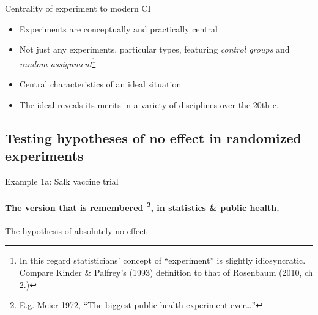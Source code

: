 \begin{frame}{Centrality of experiment to modern CI}
  \begin{itemize}
  \item Experiments are conceptually and practically central
  \item Not just any experiments, particular types, featuring
    \textit{control groups} and \textit{random assignment}\footnote{In
    this regard statisticians' concept of ``experiment'' is slightly
    idiosyncratic.  Compare Kinder \& Palfrey's (1993) definition to that of
    Rosenbaum (2010, ch 2.)}
  \item Central characteristics of an ideal situation
  \item The ideal reveals its merits in a variety of disciplines over
    the 20th c.
  \end{itemize}
\end{frame}

\subsection{Testing hypotheses of no effect in randomized experiments}
\begin{frame}{Example 1a: Salk vaccine trial}
\framesubtitle{
   The version that is remembered \footnote{E.g.
      \href{http://www.cengage.com/resource_uploads/downloads/0534094929_46500.pdf}{Meier
        1972}, ``The biggest public health experiment ever\ldots''}, in statistics \& public health. }



\end{frame}

\begin{frame}{The hypothesis of absolutely no effect}

    \vfill
  \end{frame}


